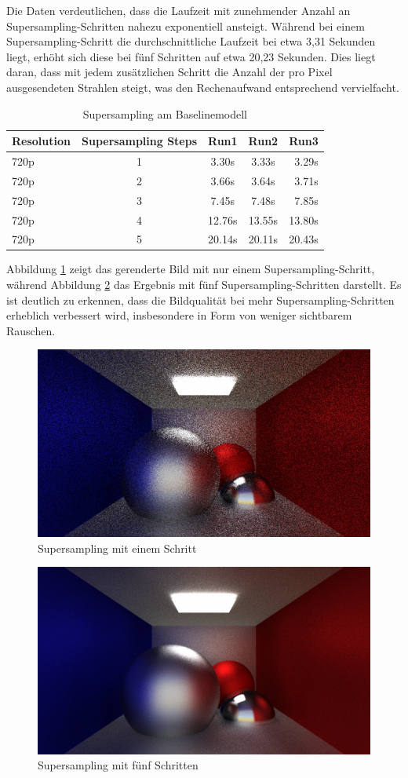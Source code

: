 \documentclass[sigconf]{acmart}
\begin{document}
Die Daten verdeutlichen, dass die Laufzeit mit zunehmender Anzahl an Supersampling-Schritten nahezu exponentiell ansteigt.
Während bei einem Supersampling-Schritt die durchschnittliche Laufzeit bei etwa 3,31 Sekunden liegt, erhöht sich diese bei fünf Schritten auf etwa 20,23 Sekunden.
Dies liegt daran, dass mit jedem zusätzlichen Schritt die Anzahl der pro Pixel ausgesendeten Strahlen steigt, was den Rechenaufwand entsprechend vervielfacht.
\begin{table}[b]
 \caption{Supersampling am Baselinemodell}

 \label{SupersamplingBaseline}
 \centering
 \small
 \begin{tabular}[h]{lcccr}
  \toprule
  Resolution & Supersampling Steps & Run1 & Run2 & Run3\\
  \midrule
  720p & 1 & 3.30s & 3.33s & 3.29s\\
  720p & 2 & 3.66s & 3.64s & 3.71s\\
  720p & 3 & 7.45s & 7.48s & 7.85s\\
  720p & 4 & 12.76s & 13.55s & 13.80s\\
  720p & 5 & 20.14s & 20.11s & 20.43s\\
  \bottomrule
 \end{tabular}
\end{table}
Abbildung \ref{Supersampling1} zeigt das gerenderte Bild mit nur einem Supersampling-Schritt, während Abbildung
\ref{Supersampling5} das Ergebnis mit fünf Supersampling-Schritten darstellt.
Es ist deutlich zu erkennen, dass die Bildqualität bei mehr Supersampling-Schritten erheblich verbessert wird, insbesondere in Form von weniger sichtbarem Rauschen.

\begin{figure}[t]
\centering
\includegraphics[width=0.7\linewidth]{img/supersampling1.png}
\caption{Supersampling mit einem Schritt}
\label{Supersampling1}
\end{figure}

\begin{figure}[t]
\centering
\includegraphics[width=0.7\linewidth]{img/supersampling5.png}
\caption{Supersampling mit fünf Schritten}
\label{Supersampling5}
\end{figure}
\end{document}
